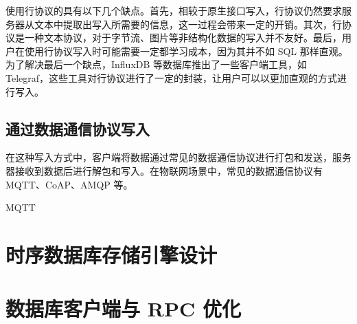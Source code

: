 使用行协议的具有以下几个缺点。首先，相较于原生接口写入，行协议仍然要求服务器从文本中提取出写入所需要的信息，这一过程会带来一定的开销。其次，行协议是一种文本协议，对于字节流、图片等非结构化数据的写入并不友好。最后，用户在使用行协议写入时可能需要一定都学习成本，因为其并不如 SQL 那样直观。为了解决最后一个缺点，InfluxDB 等数据库推出了一些客户端工具，如 Telegraf\cite{influx2024telegraf}，这些工具对行协议进行了一定的封装，让用户可以以更加直观的方式进行写入。
\subsection{通过数据通信协议写入}
在这种写入方式中，客户端将数据通过常见的数据通信协议进行打包和发送，服务器接收到数据后进行解包和写入。在物联网场景中，常见的数据通信协议有 MQTT\cite{soni2017survey}、CoAP\cite{bormann2012coap}、AMQP\cite{kramer2009advanced} 等。

MQTT

\section{时序数据库存储引擎设计}
\section{数据库客户端与 RPC 优化}